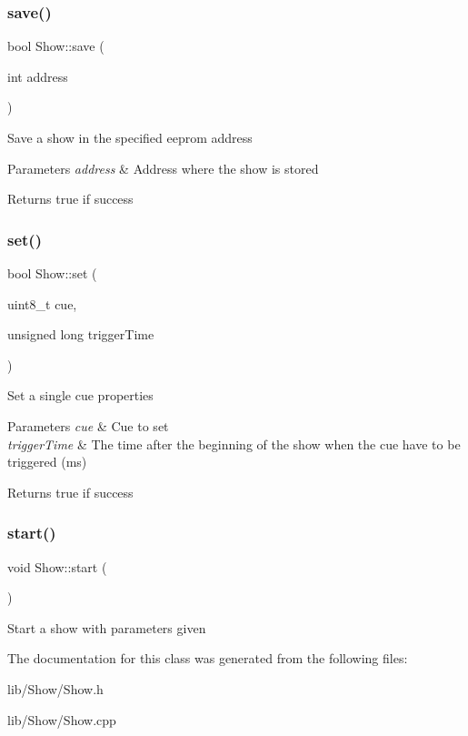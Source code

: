 \subsubsection{\texorpdfstring{save()}{save()}}
{\footnotesize\ttfamily bool Show\+::save (\begin{DoxyParamCaption}\item[{int}]{address }\end{DoxyParamCaption})}

Save a show in the specified eeprom address 
\begin{DoxyParams}{Parameters}
{\em address} & Address where the show is stored \\
\hline
\end{DoxyParams}
\begin{DoxyReturn}{Returns}
true if success 
\end{DoxyReturn}
\mbox{\label{class_show_ac4c870b4c29dac52a9bb41a99ab9fb6c}} 
\subsubsection{\texorpdfstring{set()}{set()}}
{\footnotesize\ttfamily bool Show\+::set (\begin{DoxyParamCaption}\item[{uint8\+\_\+t}]{cue,  }\item[{unsigned long}]{trigger\+Time }\end{DoxyParamCaption})}

Set a single cue properties 
\begin{DoxyParams}{Parameters}
{\em cue} & Cue to set \\
\hline
{\em trigger\+Time} & The time after the beginning of the show when the cue have to be triggered (ms) \\
\hline
\end{DoxyParams}
\begin{DoxyReturn}{Returns}
true if success 
\end{DoxyReturn}
\mbox{\label{class_show_a29cf4d64bab00f43e2873f463ae12a45}} 
\subsubsection{\texorpdfstring{start()}{start()}}
{\footnotesize\ttfamily void Show\+::start (\begin{DoxyParamCaption}{ }\end{DoxyParamCaption})}

Start a show with parameters given 

The documentation for this class was generated from the following files\+:\begin{DoxyCompactItemize}
\item 
lib/\+Show/Show.\+h\item 
lib/\+Show/Show.\+cpp\end{DoxyCompactItemize}
